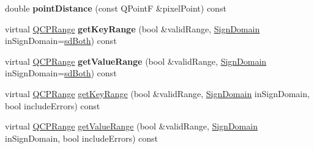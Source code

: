 \begin{DoxyCompactItemize}
\item 
\hypertarget{classQCPGraph_af93762a12a481a7edb4b3dd9e330dff1}{double {\bfseries point\-Distance} (const Q\-Point\-F \&pixel\-Point) const }\label{classQCPGraph_af93762a12a481a7edb4b3dd9e330dff1}

\item 
\hypertarget{classQCPGraph_ab39c7e8c94b64804a8dc9c19bc7d4683}{virtual \hyperlink{classQCPRange}{Q\-C\-P\-Range} {\bfseries get\-Key\-Range} (bool \&valid\-Range, \hyperlink{classQCPAbstractPlottable_a661743478a1d3c09d28ec2711d7653d8}{Sign\-Domain} in\-Sign\-Domain=\hyperlink{classQCPAbstractPlottable_a661743478a1d3c09d28ec2711d7653d8a082b98cfb91a7363a3b5cd17b0c1cd60}{sd\-Both}) const }\label{classQCPGraph_ab39c7e8c94b64804a8dc9c19bc7d4683}

\item 
\hypertarget{classQCPGraph_a9fc0c1288455fa5bb64b603d6b01de6c}{virtual \hyperlink{classQCPRange}{Q\-C\-P\-Range} {\bfseries get\-Value\-Range} (bool \&valid\-Range, \hyperlink{classQCPAbstractPlottable_a661743478a1d3c09d28ec2711d7653d8}{Sign\-Domain} in\-Sign\-Domain=\hyperlink{classQCPAbstractPlottable_a661743478a1d3c09d28ec2711d7653d8a082b98cfb91a7363a3b5cd17b0c1cd60}{sd\-Both}) const }\label{classQCPGraph_a9fc0c1288455fa5bb64b603d6b01de6c}

\item 
virtual \hyperlink{classQCPRange}{Q\-C\-P\-Range} \hyperlink{classQCPGraph_a3a69fbbaea30050a9cfe335a9a01cbf2}{get\-Key\-Range} (bool \&valid\-Range, \hyperlink{classQCPAbstractPlottable_a661743478a1d3c09d28ec2711d7653d8}{Sign\-Domain} in\-Sign\-Domain, bool include\-Errors) const 
\item 
virtual \hyperlink{classQCPRange}{Q\-C\-P\-Range} \hyperlink{classQCPGraph_acdb1e7bb86fea2764b0adb104185832b}{get\-Value\-Range} (bool \&valid\-Range, \hyperlink{classQCPAbstractPlottable_a661743478a1d3c09d28ec2711d7653d8}{Sign\-Domain} in\-Sign\-Domain, bool include\-Errors) const 
\end{DoxyCompactItemize}
